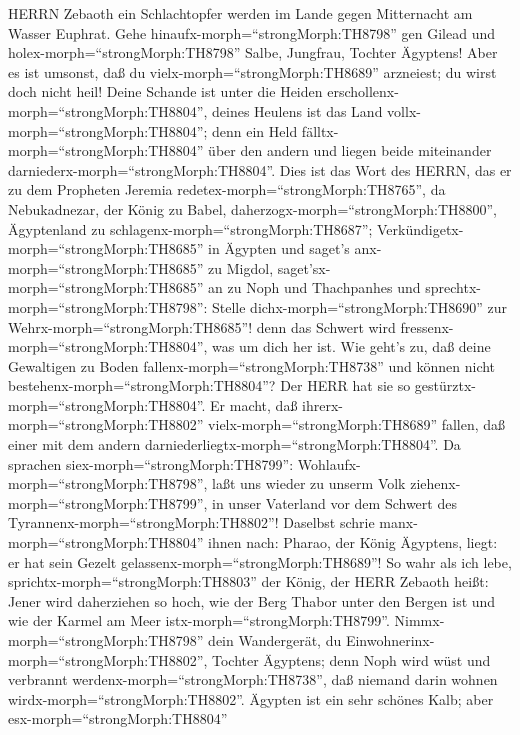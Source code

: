 HERRN Zebaoth ein Schlachtopfer werden im Lande gegen Mitternacht am
Wasser Euphrat.  Gehe hinaufx-morph=``strongMorph:TH8798''
gen Gilead und holex-morph=``strongMorph:TH8798'' Salbe, Jungfrau,
Tochter Ägyptens! Aber es ist umsonst, daß du
vielx-morph=``strongMorph:TH8689'' arzneiest; du wirst doch nicht heil!
 Deine Schande ist unter die Heiden
erschollenx-morph=``strongMorph:TH8804'', deines Heulens ist das Land
vollx-morph=``strongMorph:TH8804''; denn ein Held
fälltx-morph=``strongMorph:TH8804'' über den andern und liegen beide
miteinander darniederx-morph=``strongMorph:TH8804''.  Dies
ist das Wort des HERRN, das er zu dem Propheten Jeremia
redetex-morph=``strongMorph:TH8765'', da Nebukadnezar, der König zu
Babel, daherzogx-morph=``strongMorph:TH8800'', Ägyptenland zu
schlagenx-morph=``strongMorph:TH8687''; 
Verkündigetx-morph=``strongMorph:TH8685'' in Ägypten und saget's
anx-morph=``strongMorph:TH8685'' zu Migdol,
saget'sx-morph=``strongMorph:TH8685'' an zu Noph und Thachpanhes und
sprechtx-morph=``strongMorph:TH8798'': Stelle
dichx-morph=``strongMorph:TH8690'' zur
Wehrx-morph=``strongMorph:TH8685''! denn das Schwert wird
fressenx-morph=``strongMorph:TH8804'', was um dich her ist.
 Wie geht's zu, daß deine Gewaltigen zu Boden
fallenx-morph=``strongMorph:TH8738'' und können nicht
bestehenx-morph=``strongMorph:TH8804''? Der HERR hat sie so
gestürztx-morph=``strongMorph:TH8804''.  Er macht, daß
ihrerx-morph=``strongMorph:TH8802'' vielx-morph=``strongMorph:TH8689''
fallen, daß einer mit dem andern
darniederliegtx-morph=``strongMorph:TH8804''. Da sprachen
siex-morph=``strongMorph:TH8799'':
Wohlaufx-morph=``strongMorph:TH8798'', laßt uns wieder zu unserm Volk
ziehenx-morph=``strongMorph:TH8799'', in unser Vaterland vor dem Schwert
des Tyrannenx-morph=``strongMorph:TH8802''!  Daselbst
schrie manx-morph=``strongMorph:TH8804'' ihnen nach: Pharao, der König
Ägyptens, liegt: er hat sein Gezelt
gelassenx-morph=``strongMorph:TH8689''!  So wahr als ich
lebe, sprichtx-morph=``strongMorph:TH8803'' der König, der HERR Zebaoth
heißt: Jener wird daherziehen so hoch, wie der Berg Thabor unter den
Bergen ist und wie der Karmel am Meer istx-morph=``strongMorph:TH8799''.
 Nimmx-morph=``strongMorph:TH8798'' dein Wandergerät, du
Einwohnerinx-morph=``strongMorph:TH8802'', Tochter Ägyptens; denn Noph
wird wüst und verbrannt werdenx-morph=``strongMorph:TH8738'', daß
niemand darin wohnen wirdx-morph=``strongMorph:TH8802''. 
Ägypten ist ein sehr schönes Kalb; aber esx-morph=``strongMorph:TH8804''

